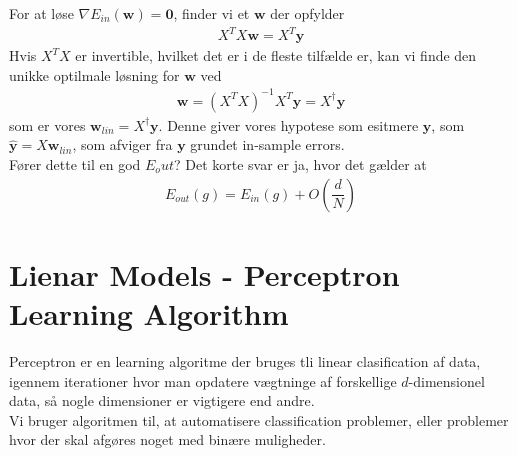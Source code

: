 \documentclass[paper=a4, fontsize=11pt]{scrartcl} %
\numberwithin{equation}{section} %
\numberwithin{figure}{section} %
\numberwithin{table}{section} %
\begin{document}
	For at løse $\nabla E_{in}(\mathbf{w})=\mathbf{0}$, finder vi et $\mathbf{w}$ der opfylder
	\begin{align*}
	X^TX\mathbf{w}=X^T\mathbf{y}
	\end{align*}
	Hvis $X^TX$ er invertible, hvilket det er i de fleste tilfælde er, kan vi finde den unikke optilmale løsning for $\mathbf{w}$ ved
	\begin{align*}
	\mathbf{w}=(X^TX)^{-1}X^T\mathbf{y}=X^\dagger\mathbf{y}
	\end{align*} 
	som er vores $\mathbf{w}_{lin}=X^\dagger\mathbf{y}$. Denne giver vores hypotese som esitmere $\mathbf{y}$, som $\hat{\mathbf{y}}=X\mathbf{w}_{lin}$, som afviger fra $\mathbf{y}$ grundet in-sample errors. \\
	
	Fører dette til en god $E_out$? Det korte svar er ja, hvor det gælder at
	\begin{align}
	E_{out}(g)=E_{in}(g)+O\left(\dfrac{d}{N}\right)
	\end{align}
	
	\newpage
	
	\section*{Lienar Models - Perceptron Learning Algorithm}
	
	Perceptron er en learning algoritme der bruges tli linear clasification af data, igennem iterationer hvor man opdatere vægtninge af forskellige $d$-dimensionel data, så nogle dimensioner er vigtigere end andre. \\
	
	Vi bruger algoritmen til, at automatisere classification problemer, eller problemer hvor der skal afgøres noget med binære muligheder. \\
	
\end{document}
